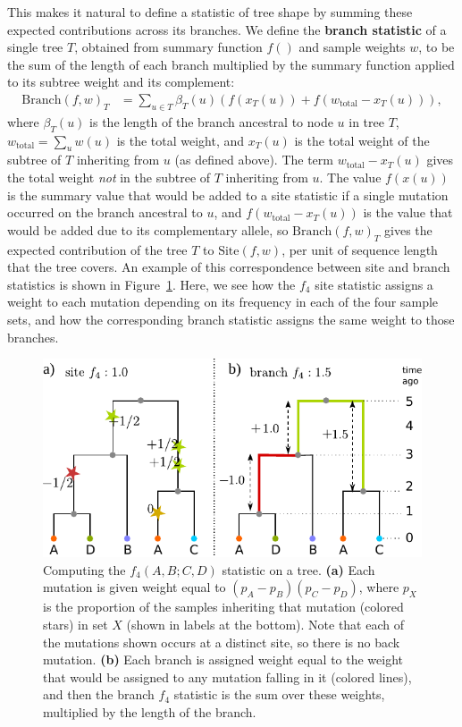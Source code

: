 \documentclass{article}
\newcommand{\branch}{\mbox{Branch}} %
\newcommand{\site}{\mbox{Site}} %
\newcommand{\iw}{w} %
\newcommand{\tiw}{w_\text{total}} %
\newcommand{\nw}{x} %
\begin{document}
This makes it natural to define
a statistic of tree shape by summing these expected contributions across its branches.
We define the \textbf{branch statistic} of a single tree $T$,
obtained from summary function $f()$ and sample weights $\iw$,
to be the sum of the length of each branch
multiplied by the summary function applied to its subtree weight and its complement:
\begin{align}\label{eqn:branch_stat_tree}
    \branch(f, \iw)_T
    &=
    \sum_{u \in T} \beta_{T}(u) \left( f(\nw_{T}(u)) + f(\tiw - \nw_{T}(u)) \right)  ,
\end{align}
where $\beta_{T}(u)$ is the length of the branch ancestral to node $u$ in tree $T$,
$\tiw = \sum_u \iw(u)$ is the total weight,
and $\nw_{T}(u)$ is the total weight of the subtree of $T$ inheriting from $u$ (as defined above).
The term $\tiw - \nw_{T}(u)$ gives the total weight \emph{not} in the subtree of $T$ inheriting from $u$.
The value $f(\nw(u))$ is the summary value that would be added to a site statistic
if a single mutation occurred on the branch ancestral to $u$,
and $f(\tiw - \nw_{T}(u))$ is the value that would be added due to its complementary allele,
so $\branch(f, \iw)_T$ gives the expected contribution of the tree $T$ to $\site(f, \iw)$,
per unit of sequence length that the tree covers.
An example of this correspondence between site and branch statistics
is shown in Figure~\ref{fig:branch_site_diagram}. Here, we
see how the $f_4$ site statistic assigns a weight to each mutation
depending on its frequency in each of the four sample sets,
and how the corresponding branch statistic assigns the same weight to those branches.

\begin{figure}
    \centering
    \includegraphics{figures/branch_site_diagram}
    \caption{
    Computing the $f_4(A,B;C,D)$ statistic on a tree.
    \textbf{(a)} Each mutation is given weight equal to $(p_A - p_B)(p_C - p_D)$,
    where $p_X$ is the proportion of the samples inheriting that mutation (colored stars) in set $X$
    (shown in labels at the bottom).
    Note that each of the mutations shown occurs at a distinct site, so there is no back mutation.
    \textbf{(b)} Each branch is assigned weight equal to the weight that would be assigned
    to any mutation falling in it (colored lines), and then the branch $f_4$ statistic
    is the sum over these weights, multiplied by the length of the branch.
        \label{fig:branch_site_diagram}
    }
\end{figure}
\end{document}
